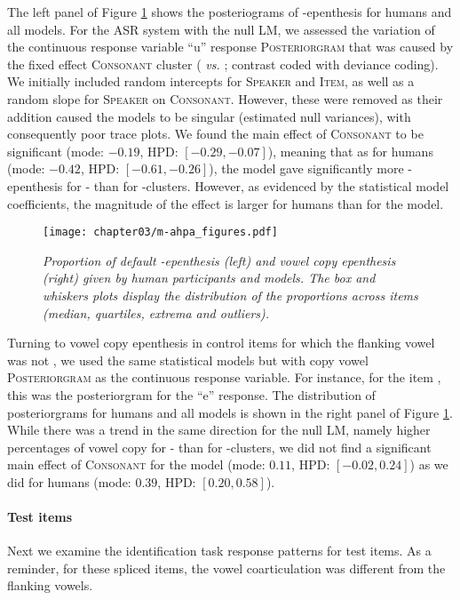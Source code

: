 {The left panel of Figure \ref{fig:m-ahpa_ctrl} shows the posteriograms of -epenthesis for humans and all models. For the ASR system with the null LM, we assessed the variation of the continuous response variable ``u'' response \textsc{Posteriorgram} that was caused by the fixed effect \textsc{Consonant} cluster ( \textit{vs.} ; contrast coded with deviance coding).
We initially included random intercepts for \textsc{Speaker} and \textsc{Item}, as well as a random slope for \textsc{Speaker} on \textsc{Consonant}. However, these were removed as their addition caused the models to be singular (estimated null variances), with consequently poor trace plots.
We found the main effect of \textsc{Consonant} to be significant (mode: $-0.19$, HPD: $[-0.29,-0.07]$), meaning that as for humans (mode: $-0.42$, HPD: $[-0.61,-0.26]$), the model gave significantly more -epenthesis for - than for -clusters. However, as evidenced by the statistical model coefficients, the magnitude of the effect is larger for humans than for the model.  

\begin{figure}[htb]
\centering
\texttt{[image: chapter03/m-ahpa\_figures.pdf]}
\caption{\textit{Proportion of default -epenthesis (left) and vowel copy epenthesis (right) given by human participants and models. The box and whiskers plots display the distribution of the proportions across items (median, quartiles, extrema and outliers).}}
\label{fig:m-ahpa_ctrl}
\end{figure}

Turning to vowel copy epenthesis in control items for which the flanking vowel was not , we used the same statistical models but with copy vowel \textsc{Posteriorgram} as the continuous response variable. For instance, for the item , this was the posteriorgram for the ``e'' response. The distribution of posteriorgrams for humans and all models is shown in the right panel of Figure \ref{fig:m-ahpa_ctrl}.
While there was a trend in the same direction for the null LM, namely higher percentages of vowel copy for - than for -clusters, we did not find a significant main effect of \textsc{Consonant} for the model (mode: $0.11$, HPD: $[-0.02, 0.24]$) as we did for humans (mode: $0.39$, HPD: $[0.20, 0.58]$). 

\paragraph{Test items}
Next we examine the identification task response patterns for test items. As a reminder, for these spliced items, the vowel coarticulation was different from the flanking vowels.

}
